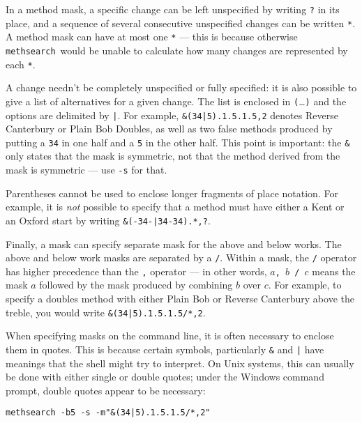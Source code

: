 \documentclass[a4paper,11pt,oneside]{book}
\makeatletter
\newcommand{\symidx}[2]{} %
\def\methsearch{\texttt{meth\-search}}
\makeatother
\begin{document}
In a method mask, a specific change can be left unspecified by writing 
\verb+?+\symidx{?}{method mask} in its place, 
and a sequence of several consecutive 
unspecified changes can be written \verb+*+.\symidx{*}{method mask}  
A method mask can have at most one \verb+*+ ---
this is because otherwise \methsearch\ would be unable 
to calculate how many changes are represented by each \verb+*+.

A change needn't be completely unspecified or fully specified: it is also
possible to give a list of alternatives for a given change.  The list is 
enclosed in \verb+(+\ldots\verb+)+ 
and the options are delimited by \verb+|+.\symidx{"|}{method mask}  
For example, \verb+&(34|5).1.5.1.5,2+ denotes Reverse Canterbury
or Plain Bob Doubles, as well as two false methods produced by putting a
\verb+34+ in one half and a \verb+5+ in the other half.  This point is 
important: the \verb+&+ only states that the mask is symmetric, not that
the method derived from the mask is symmetric --- use \verb+-s+ for that.

Parentheses cannot be used to enclose longer fragments of place notation.
For example, it is \textit{not} possible to specify that a method must have 
either a Kent or an Oxford start by writing \verb+&(-34-|34-34).*,?+.

Finally, a mask can specify separate mask for the above
and below works.  The above and below 
work masks are separated by a \verb+/+.\symidx{/}{method mask}
Within a mask, the \verb+/+ operator has higher 
precedence than the 
\verb+,+ operator --- in other words, 
\texttt{$a$, $b$ / $c$} means the mask $a$
followed by the mask produced by combining $b$ over $c$.  For example,
to specify a doubles method with either Plain Bob or Reverse Canterbury
above the treble, you would write \verb+&(34|5).1.5.1.5/*,2+.

When specifying masks on the command line, it is often necessary to enclose 
them in quotes.
This is because certain symbols, particularly \verb+&+ and
\verb+|+ have meanings that the shell might try to interpret.  On Unix systems,
this can usually be done with either single or double quotes; under the 
Windows command prompt, double quotes appear to be necessary:

\begin{Verbatim}
methsearch -b5 -s -m"&(34|5).1.5.1.5/*,2"
\end{Verbatim}
\end{document}
